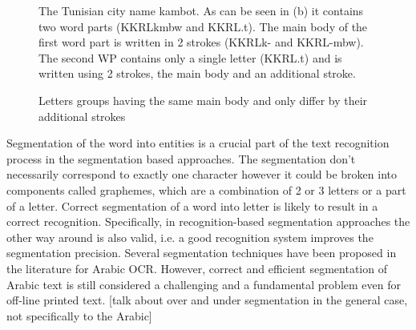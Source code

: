 \documentclass[12pt,journal,compsoc]{IEEEtran}
\begin{document}
\begin{figure}[h]
\centering
    \caption{The Tunisian city name kambot. As can be seen in (b) it contains two word parts (KKRL{kmbw} and  KKRL{.t}). The main body of the first word part is written in 2 strokes (KKRL{k-} and KKRL{-mbw}). The second WP contains only a single letter (KKRL{.t}) and is written using 2 strokes, the main body and an additional stroke.   
     }
   \label{fig:kmbot}
\end{figure}

\begin{figure}[h]
\centering
    \caption{
        Letters groups having the same main body and only differ by their additional strokes
     }
   \label{fig:same_main_body_letters}
\end{figure}

Segmentation of the word into entities is a crucial part of the text recognition process in the segmentation based approaches. The segmentation don't necessarily correspond to exactly one character however it could be broken into components called graphemes, which are a combination of 2 or 3 letters or a part of a letter.  Correct segmentation of a word into letter is likely to result in a correct recognition. Specifically, in recognition-based segmentation approaches the other way around is also valid, i.e. a good recognition system improves the segmentation precision. Several segmentation techniques have been proposed in the literature for Arabic OCR. However, correct and efficient segmentation of Arabic text is still considered a challenging and a fundamental problem even for off-line printed text.
[talk about over and under segmentation in the general case, not specifically to the Arabic]\\
\end{document}
